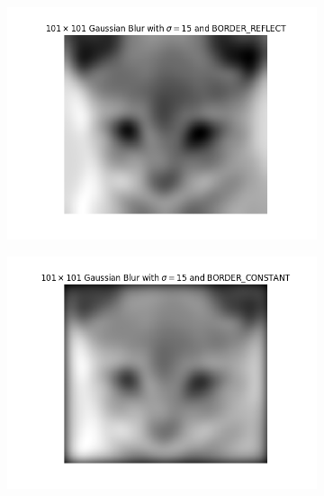 \documentclass[11pt,a4paper]{article}
\begin{document}
\begin{figure}[H]
\begin{subfigure}{.5\textwidth}
	\centering
	\includegraphics[scale=0.47]{img/gauss-border1.png}
	\label{fig:gauss-border1}
\end{subfigure}
\begin{subfigure}{.5\textwidth}
	\centering
	\includegraphics[scale=0.47]{img/gauss-border2.png}
	\label{fig:gauss-border2}
\end{subfigure}
\end{figure}
\end{document}
